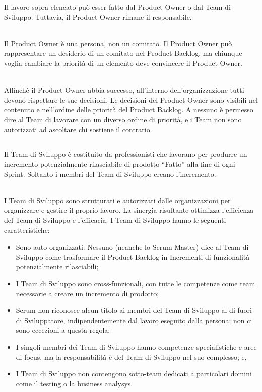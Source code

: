 \noindent Il lavoro sopra elencato pu\`o esser fatto dal Product Owner o dal Team di Sviluppo. Tuttavia, il Product Owner 
rimane il responsabile.  \newline

\\Il Product Owner \`e una persona, non un comitato. Il Product Owner pu\`o rappresentare un desiderio di un comitato nel 
Product Backlog, ma chiunque voglia cambiare la priorit\`a di un elemento deve convincere il Product Owner. \newline

\\Affinch\`e il Product Owner abbia successo, all'interno dell'organizzazione tutti devono rispettare le sue decisioni. Le 
decisioni del Product Owner sono visibili nel contenuto e nell'ordine delle priorit\`a del Product Backlog. A nessuno \`e 
permesso dire al Team di lavorare con un diverso ordine di priorit\`a, e i Team non sono autorizzati ad ascoltare chi sostiene 
il contrario. 

\subsection*{\color{SteelBlue}{Il Team di Sviluppo}}%
\label{sec:development_team}
Il Team di Sviluppo \`e costituito da professionisti che lavorano per produrre un incremento potenzialmente rilasciabile di 
prodotto ``Fatto'' alla fine di ogni Sprint. Soltanto i membri del Team di Sviluppo creano l'incremento. \newline

\\I Team di Sviluppo sono strutturati e autorizzati dalle organizzazioni per organizzare e gestire il proprio lavoro. La 
sinergia risultante ottimizza l'efficienza del Team di Sviluppo e l'efficacia. I Team di Sviluppo hanno le seguenti 
caratteristiche:

\begin{itemize}
	\item Sono auto-organizzati. Nessuno (neanche lo Scrum Master) dice al Team di Sviluppo come trasformare il Product Backlog 
	in Incrementi di funzionalit\`a potenzialmente rilasciabili;
	\item I Team di Sviluppo sono cross-funzionali, con tutte le competenze come team necessarie a creare un incremento di 
	prodotto;
	\item Scrum non riconosce alcun titolo ai membri del Team di Sviluppo al di fuori di Sviluppatore, indipendentemente dal 
	lavoro eseguito dalla persona; non ci sono eccezioni a questa regola;
	\item I singoli membri dei Team di Sviluppo hanno competenze specialistiche e aree di focus, ma la responsabilit\`a \`e del 
	Team di Sviluppo nel suo complesso; e,
	\item I Team di Sviluppo non contengono sotto-team dedicati a particolari domini come il testing o la business analysys.
\end{itemize}

